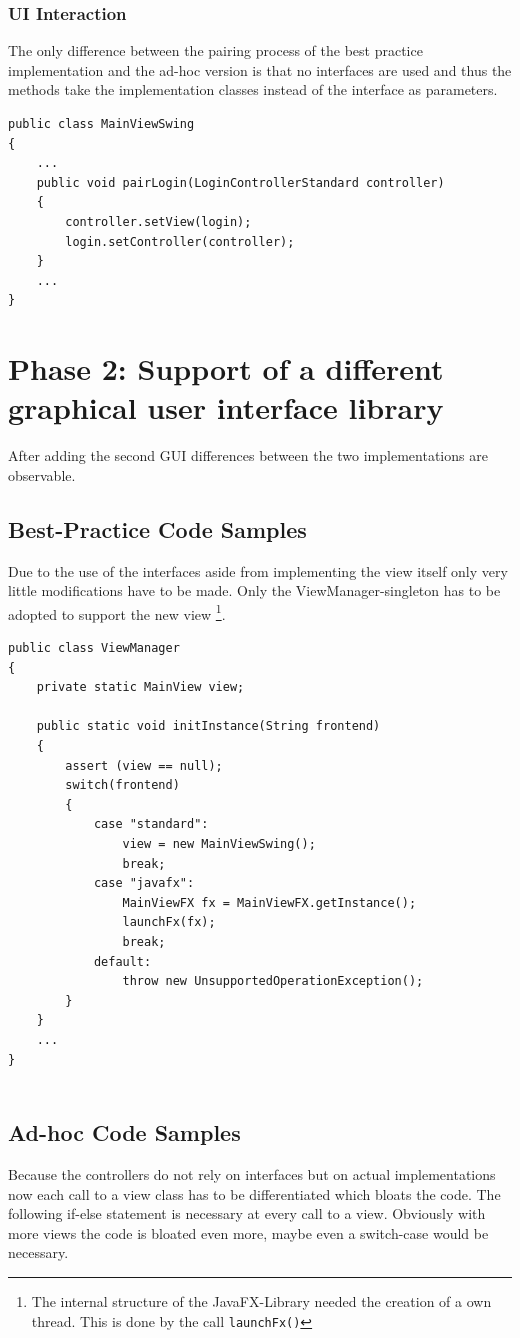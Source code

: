\subsubsection{UI Interaction}
The only difference between the pairing process of the best practice implementation and the ad-hoc version is that no interfaces are used and thus the methods take the implementation  classes instead of the interface as parameters. 

\begin{lstlisting}
public class MainViewSwing
{
	...
	public void pairLogin(LoginControllerStandard controller)
	{
		controller.setView(login);
		login.setController(controller);
	}
	...
}
\end{lstlisting}


\section{Phase 2: Support of a different graphical user interface library}
After adding the second GUI differences between the two implementations are observable.

\subsection{Best-Practice Code Samples}
Due to the use of the interfaces aside from implementing the view itself only very little modifications have to be made. Only the ViewManager-singleton has to be adopted to support the new view \footnote{The internal structure of the JavaFX-Library needed the creation of a own thread. This is done by the call \texttt{launchFx()}}.

\begin{lstlisting}
public class ViewManager
{
	private static MainView view;
	
	public static void initInstance(String frontend)
	{
		assert (view == null);
		switch(frontend)
		{
			case "standard":
				view = new MainViewSwing();
				break;
			case "javafx":
				MainViewFX fx = MainViewFX.getInstance();
				launchFx(fx);
				break;
			default:
				throw new UnsupportedOperationException();
		}
	}
	...
}
	
\end{lstlisting}

\subsection{Ad-hoc Code Samples}
Because the controllers do not rely on interfaces but on actual implementations now each call to a view class has to be differentiated which bloats the code. The following if-else statement is necessary at every call to a view. Obviously with more views the code is bloated even more, maybe even a switch-case would be necessary.

